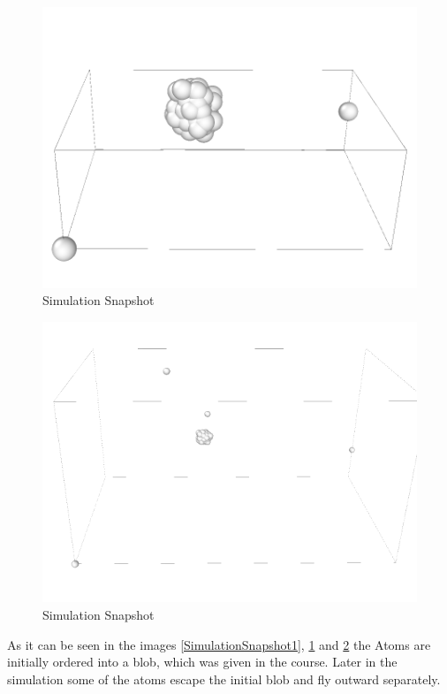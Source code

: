 \begin{figure}
	\begin{center}
		\includegraphics[scale= 0.75]{Figure/2ImageS.png}
	\end{center}
	\caption[Simulation Snapshot]{Simulation Snapshot }
	\label{SimulationSnapshot2}
\end{figure}

\begin{figure}
	\begin{center}
		\includegraphics[scale= 0.65]{Figure/3ImageS.png}
	\end{center}
	\caption[Simulation Snapshot]{Simulation Snapshot }
	\label{SimulationSnapshot3}
\end{figure}
As it can be seen in the images \ref{SimulationSnapshot1}, \ref{SimulationSnapshot2} and \ref{SimulationSnapshot3} the Atoms are initially ordered into a blob, which was given in the course. 
Later in the simulation some of the atoms escape the initial blob and fly outward separately. 
